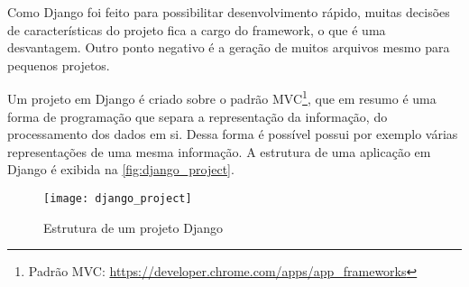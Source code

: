 		Como Django foi feito para possibilitar desenvolvimento rápido, muitas decisões de características do projeto fica a cargo do framework, o que é uma desvantagem. Outro ponto negativo é a geração de muitos arquivos mesmo para pequenos projetos.
		
		Um projeto em Django é criado sobre o padrão MVC\footnote{Padrão MVC: \url{https://developer.chrome.com/apps/app_frameworks}}, que em resumo é uma forma de programação que separa a representação da informação, do processamento dos dados em si. Dessa forma é possível possui por exemplo várias representações de uma mesma informação. A estrutura de uma aplicação em Django é exibida na \autoref{fig:django_project}.
			
		\begin{figure}[!htb]	
			\captionsetup{justification=centering}
			\begin{center}
				\texttt{[image: django\_project]}  %
				\caption[Estrutura de um projeto Django]{\label{fig:django_project} Estrutura de um projeto Django}
			\end{center}		
		\end{figure}
		
		
		
